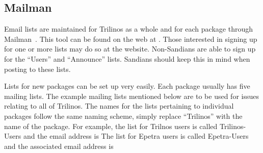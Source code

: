 \documentclass[12pt,relax]{TrilinosDevGuide}
\begin{document}
\subsection{Mailman}
\label{subsect:MailMan}
Email lists are maintained for Trilinos as a whole and for each package 
through Mailman~\cite{Mailman}.  This tool can be found on the web at 
\newline
{}.  
Those interested in signing 
up for one or more lists may do so at the website.  Non-Sandians are able to 
sign up for the ``Users'' and ``Announce'' lists.  Sandians should keep this 
in mind when posting to these lists.

Lists for new packages can be set up very easily.  Each package usually has 
five mailing lists.  The example mailing lists mentioned below are to be used 
for issues relating to all of Trilinos.  The names for the lists pertaining to 
individual packages follow the same naming scheme, simply replace ``Trilinos'' 
with the name of the package.  For example, the list for Trilnos users is 
called Trilinos-Users and the email address is 
  The list 
for Epetra users is called Epetra-Users and the associated email address is 
\end{document}
